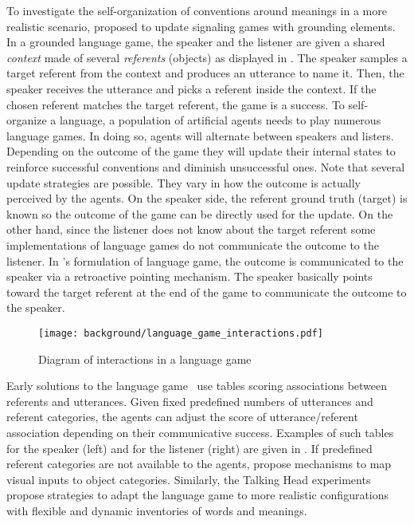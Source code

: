 To investigate the self-organization of conventions around meanings in a more realistic scenario, \citet{steels2012grounded} proposed to update signaling games with grounding elements.  In a grounded language game, the speaker and the listener are given a shared \textit{context} made of several \textit{referents} (objects) as displayed in . The speaker samples a target referent from the context and produces an utterance to name it. Then, the speaker receives the utterance and picks a referent inside the context. If the chosen referent matches the target referent, the game is a success. To self-organize a language, a population of artificial agents needs to play numerous language games. In doing so, agents will alternate between speakers and listers. Depending on the outcome of the game they will update their internal states to reinforce successful conventions and diminish unsuccessful ones. Note that several update strategies are possible. They vary in how the outcome is actually perceived by the agents. On the speaker side, the referent ground truth (target) is known so the outcome of the game can be directly used for the update. On the other hand, since the listener does not know about the target referent some implementations of language games do not communicate the outcome to the listener. In \citet{steels2001language}'s formulation of language game, the outcome is communicated to the speaker via a retroactive pointing mechanism. The speaker basically points toward the target referent at the end of the game to communicate the outcome to the speaker.

\begin{figure}[!h]
\centering
\texttt{[image: background/language\_game\_interactions.pdf]}	
\caption{Diagram of interactions in a language game}
\label{fig:language_game_interactions}
\end{figure}

Early solutions to the language game~\citep{lipowska2011naming,steels2012grounded} use tables scoring associations between referents and utterances. Given fixed predefined numbers of utterances and referent categories, the agents can adjust the score of utterance/referent association depending on their communicative success. Examples of such tables for the speaker (left) and for the listener (right) are given in .  If predefined referent categories are not available to the agents, \citet{steels2012grounded} propose mechanisms to map visual inputs to object categories. Similarly, the Talking Head experiments~\citep{steels2015talkingheads} propose strategies to adapt the language game to more realistic configurations with flexible and dynamic inventories of words and meanings.

